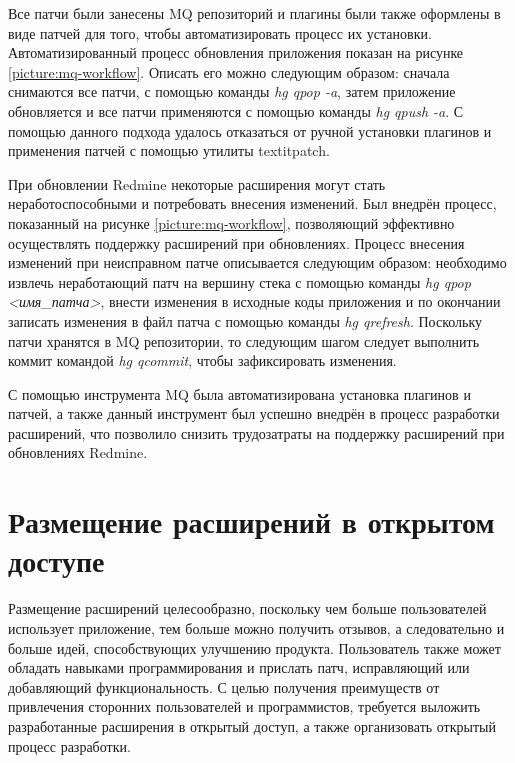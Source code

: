 Все патчи были занесены MQ репозиторий и плагины были также оформлены в виде
патчей для того, чтобы автоматизировать процесс их установки.
Автоматизированный процесс обновления приложения показан на рисунке
\ref{picture:mq-workflow}. Описать его можно следующим образом: сначала
снимаются все патчи, с помощью команды \textit{hg qpop -a}, затем приложение
обновляется и все патчи применяются с помощью команды \textit{hg qpush -a}. С
помощью данного подхода удалось отказаться от ручной установки плагинов и
применения патчей с помощью утилиты textit{patch}.

При обновлении Redmine некоторые расширения могут стать неработоспособными и
потребовать внесения изменений. Был внедрён процесс, показанный на рисунке
\ref{picture:mq-workflow}, позволяющий эффективно осуществлять поддержку
расширений при обновлениях. Процесс внесения изменений при неисправном патче
описывается следующим образом: необходимо извлечь неработающий патч на вершину
стека с помощью команды \textit{hg qpop <имя\_патча>}, внести изменения в
исходные коды приложения и по окончании записать изменения в файл патча с
помощью команды \textit{hg qrefresh}. Поскольку патчи хранятся в MQ
репозитории, то следующим шагом следует выполнить коммит командой \textit{hg
qcommit}, чтобы зафиксировать изменения.

С помощью инструмента MQ была автоматизирована установка плагинов и патчей, а
также данный инструмент был успешно внедрён в процесс разработки расширений,
что позволило снизить трудозатраты на поддержку расширений при обновлениях
Redmine.

\section{Размещение расширений в открытом доступе}
Размещение расширений целесообразно, поскольку чем больше
пользователей использует приложение, тем больше можно получить отзывов, а
следовательно и больше идей, способствующих улучшению продукта.
Пользователь также может обладать навыками программирования и прислать патч,
исправляющий или добавляющий функциональность. С целью получения преимуществ от
привлечения сторонних пользователей и программистов, требуется выложить
разработанные расширения в открытый доступ, а также организовать открытый
процесс разработки.


